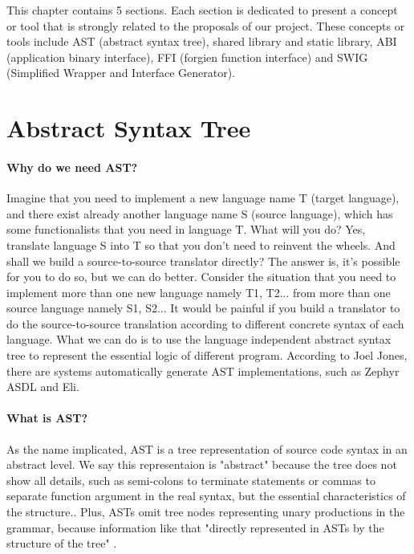  \label{chap:Conceptions}
This chapter contains 5 sections. Each section is dedicated to present a concept or tool that is strongly related to the proposals of our project. These concepts or tools include AST (abstract syntax tree), shared library and static library, ABI (application binary interface), FFI (forgien function interface) and SWIG (Simplified Wrapper and Interface Generator).

\section{Abstract Syntax Tree}

\paragraph{Why do we need AST?}

Imagine that you need to implement a new language name T (target language), and there exist already another language name S (source language), which has some functionalists that you need in language T. What will you do? Yes, translate language S into T so that you don't need to reinvent the wheels. And shall we build a source-to-source translator directly? The answer is, it's possible for you to do so, but we can do better. Consider the situation that you need to implement more than one new language namely T1, T2... from more than one source language namely S1, S2... It would be painful if you build a translator to do the source-to-source translation according to different concrete syntax of each language. What we can do is to use the language independent abstract syntax tree to represent the essential logic of different program. According to Joel Jones\cite{Joel-Jones-03}, there are systems automatically generate AST implementations, such as Zephyr ASDL\cite{Daniel-97} and Eli\cite{Robert-92}. 


\paragraph{What is AST?}

As the name implicated, AST is a tree representation of source code syntax in an abstract level. We say this representaion is "abstract" because the tree does not show all details, such as semi-colons to terminate statements or commas to separate function argument in the real syntax, but the essential characteristics of the structure.\cite {Joel-Jones-03}. Plus, ASTs omit tree nodes representing unary productions in the grammar, because information like that 
"directly represented in ASTs by the structure of the tree"
\cite {Joel-Jones-03}.

